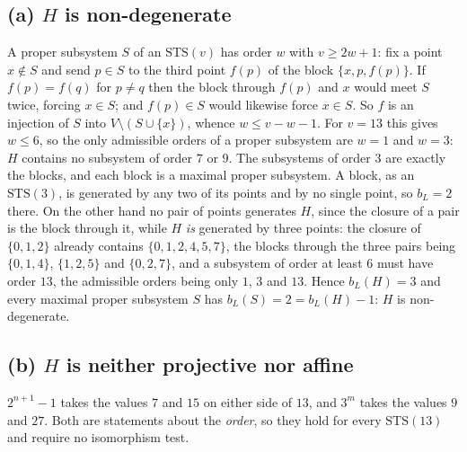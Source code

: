 \documentclass[11pt]{amsart}
\newcommand{\STS}{\mathrm{STS}}
\newcommand{\bL}{b_{L}}
\begin{document}
\subsection*{(a) $H$ is non-degenerate}
A proper subsystem $S$ of an $\STS(v)$ has order $w$ with $v\ge2w+1$: fix a
point $x\notin S$ and send $p\in S$ to the third point $f(p)$ of the block
$\{x,p,f(p)\}$. If $f(p)=f(q)$ for $p\ne q$ then the block through $f(p)$ and
$x$ would meet $S$ twice, forcing $x\in S$; and $f(p)\in S$ would likewise force
$x\in S$. So $f$ is an injection of $S$ into $V\setminus(S\cup\{x\})$, whence
$w\le v-w-1$. For $v=13$ this gives $w\le6$, so the only admissible orders of a
proper subsystem are $w=1$ and $w=3$: $H$ contains no subsystem of order $7$ or
$9$. The subsystems of order $3$ are exactly the blocks, and each block is a
maximal proper subsystem. A block, as an $\STS(3)$, is generated by any two of
its points and by no single point, so $\bL=2$ there. On the other hand no pair
of points generates $H$, since the closure of a pair is the block through it,
while $H$ \emph{is} generated by three points: the closure of $\{0,1,2\}$ already
contains $\{0,1,2,4,5,7\}$, the blocks through the three pairs being
$\{0,1,4\}$, $\{1,2,5\}$ and $\{0,2,7\}$, and a subsystem of order at least $6$
must have order $13$, the admissible orders being only $1$, $3$ and $13$. Hence
$\bL(H)=3$ and every maximal proper subsystem $S$ has
$\bL(S)=2=\bL(H)-1$: $H$ is non-degenerate.

\subsection*{(b) $H$ is neither projective nor affine}
$2^{n+1}-1$ takes the values $7$ and $15$ on either side of $13$, and $3^m$
takes the values $9$ and $27$. Both are statements about the \emph{order}, so
they hold for every $\STS(13)$ and require no isomorphism test.
\end{document}

